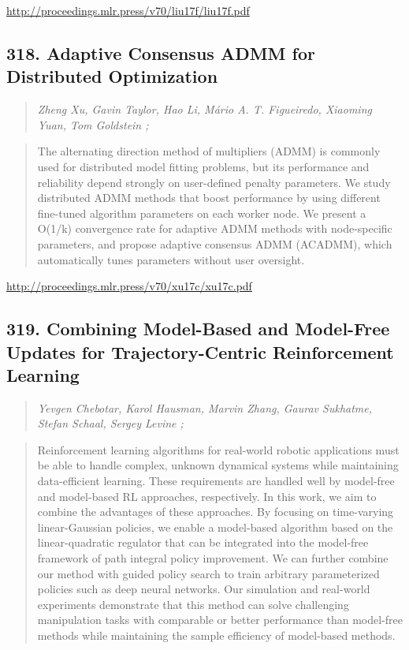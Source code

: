 \documentclass{article}
\begin{document}
\href{http://proceedings.mlr.press/v70/liu17f/liu17f.pdf}{http://proceedings.mlr.press/v70/liu17f/liu17f.pdf}

\subsection{318. Adaptive Consensus ADMM for Distributed Optimization}

\begin{quote}
\footnotesize{\textit{Zheng Xu, Gavin Taylor, Hao Li, Mário A. T. Figueiredo, Xiaoming Yuan, Tom Goldstein ;}}

\end{quote}

\begin{quote}
    The alternating direction method of multipliers (ADMM) is commonly used for distributed model fitting problems, but its performance and reliability depend strongly on user-defined penalty parameters. We study distributed ADMM methods that boost performance by using different fine-tuned algorithm parameters on each worker node. We present a O(1/k) convergence rate for adaptive ADMM methods with node-specific parameters, and propose adaptive consensus ADMM (ACADMM), which automatically tunes parameters without user oversight.  
\end{quote}

\href{http://proceedings.mlr.press/v70/xu17c/xu17c.pdf}{http://proceedings.mlr.press/v70/xu17c/xu17c.pdf}

\subsection{319. Combining Model-Based and Model-Free Updates for Trajectory-Centric Reinforcement Learning}

\begin{quote}
\footnotesize{\textit{Yevgen Chebotar, Karol Hausman, Marvin Zhang, Gaurav Sukhatme, Stefan Schaal, Sergey Levine ;}}

\end{quote}

\begin{quote}
    Reinforcement learning algorithms for real-world robotic applications must be able to handle complex, unknown dynamical systems while maintaining data-efficient learning. These requirements are handled well by model-free and model-based RL approaches, respectively. In this work, we aim to combine the advantages of these approaches. By focusing on time-varying linear-Gaussian policies, we enable a model-based algorithm based on the linear-quadratic regulator that can be integrated into the model-free framework of path integral policy improvement. We can further combine our method with guided policy search to train arbitrary parameterized policies such as deep neural networks. Our simulation and real-world experiments demonstrate that this method can solve challenging manipulation tasks with comparable or better performance than model-free methods while maintaining the sample efficiency of model-based methods.  
\end{quote}
\end{document}
